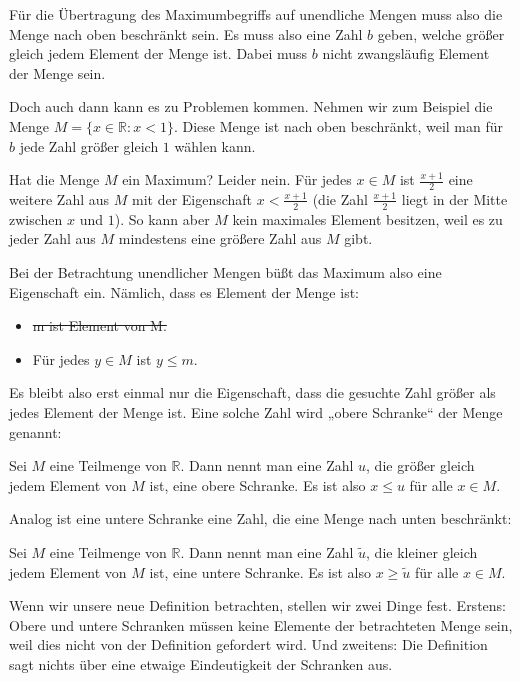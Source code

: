 \documentclass[fontsize=9pt,
               parskip=half-,
               DIV=14,
               listof=chapterentry,
               tocflat]{scrbook}
\begin{document}
Für die Übertragung des Maximumbegriffs auf unendliche Mengen muss also die Menge nach oben beschränkt sein. Es muss also eine Zahl $b$ geben, welche größer gleich jedem Element der Menge ist. Dabei muss $b$ nicht zwangsläufig Element der Menge sein.

Doch auch dann kann es zu Problemen kommen. Nehmen wir zum Beispiel die Menge $M=\{x\in \mathbb {R} :x<1\}$. Diese Menge ist nach oben beschränkt, weil man für $b$ jede Zahl größer gleich $1$ wählen kann.

Hat die Menge $M$ ein Maximum? Leider nein. Für jedes $x\in M$ ist ${\tfrac {x+1}{2}}$ eine weitere Zahl aus $M$ mit der Eigenschaft $x<{\tfrac {x+1}{2}}$ (die Zahl ${\tfrac {x+1}{2}}$ liegt in der Mitte zwischen $x$ und $1$). So kann aber $M$ kein maximales Element besitzen, weil es zu jeder Zahl aus $M$ mindestens eine größere Zahl aus $M$ gibt.

Bei der Betrachtung unendlicher Mengen büßt das Maximum also eine Eigenschaft ein. Nämlich, dass es Element der Menge ist:

\begin{itemize}
\item \sout{m ist Element von M.}
\item Für jedes $y\in M$ ist $y\leq m$.
\end{itemize}

Es bleibt also erst einmal nur die Eigenschaft, dass die gesuchte Zahl größer als jedes Element der Menge ist. Eine solche Zahl wird „obere Schranke“ der Menge genannt:

\begin{definition*}
Sei $M$ eine Teilmenge von $\mathbb {R} $. Dann nennt man eine Zahl $u$, die größer gleich jedem Element von $M$ ist, eine obere Schranke. Es ist also $x\leq u$ für alle $x\in M$.

\end{definition*}

Analog ist eine untere Schranke eine Zahl, die eine Menge nach unten beschränkt:

\begin{definition*}
Sei $M$ eine Teilmenge von $\mathbb {R} $. Dann nennt man eine Zahl ${\tilde {u}}$, die kleiner gleich jedem Element von $M$ ist, eine untere Schranke. Es ist also $x\geq {\tilde {u}}$ für alle $x\in M$.

\end{definition*}

Wenn wir unsere neue Definition betrachten, stellen wir zwei Dinge fest. Erstens: Obere und untere Schranken müssen keine Elemente der betrachteten Menge sein, weil dies nicht von der Definition gefordert wird. Und zweitens: Die Definition sagt nichts über eine etwaige Eindeutigkeit der Schranken aus.
\end{document}
